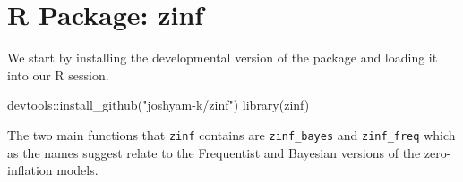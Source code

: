 \documentclass[12pt,twoside]{reedthesis}
\newenvironment{Shaded}{\begin{snugshade}}{\end{snugshade}}
\newcommand{\FunctionTok}[1]{\textcolor[rgb]{0.00,0.00,0.00}{#1}}
\newcommand{\NormalTok}[1]{#1}
\newcommand{\SpecialCharTok}[1]{\textcolor[rgb]{0.00,0.00,0.00}{#1}}
\newcommand{\StringTok}[1]{\textcolor[rgb]{0.31,0.60,0.02}{#1}}
\begin{document}
\hypertarget{r-package-zinf}{%
\section{R Package: zinf}\label{r-package-zinf}}

We start by installing the developmental version of the package and loading it into our R session.
\begin{Shaded}
\begin{Highlighting}[]
\NormalTok{devtools}\SpecialCharTok{::}\FunctionTok{install\_github}\NormalTok{(}\StringTok{"joshyam{-}k/zinf"}\NormalTok{)}
\FunctionTok{library}\NormalTok{(zinf)}
\end{Highlighting}
\end{Shaded}
The two main functions that \texttt{zinf} contains are \texttt{zinf\_bayes} and \texttt{zinf\_freq} which as the names suggest relate to the Frequentist and Bayesian versions of the zero-inflation models.
\end{document}
